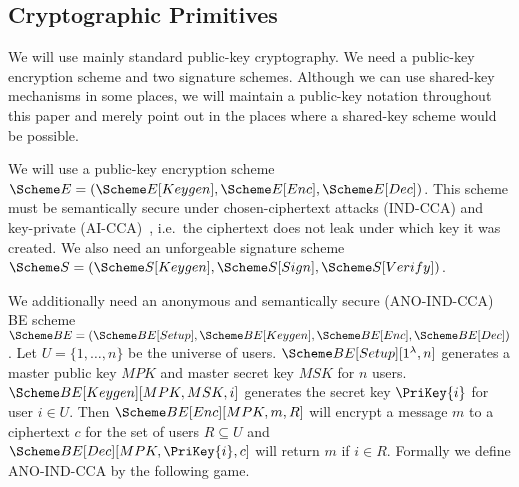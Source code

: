 \subsection{Cryptographic Primitives}
\label{CryptoPrimitives}

We will use mainly standard public-key cryptography.
We need a public-key encryption scheme and two signature schemes.
Although we can use shared-key mechanisms in some places, we will maintain 
a public-key notation throughout this paper and merely point out in the places 
where a shared-key scheme would be possible.

We will use a public-key encryption scheme \(\E = (\E[Keygen], \E[Enc], 
  \E[Dec])\).
This scheme must be semantically secure under chosen-ciphertext attacks 
(IND-CCA) and key-private (AI-CCA)~\cite{KeyPrivacy}, i.e.\ the ciphertext does 
not leak under which key it was created.
We also need an unforgeable signature scheme \(\S = (\S[Keygen], \S[Sign], 
  \S[Verify])\).

We additionally need an anonymous and semantically secure 
(ANO-IND-CCA)~\cite{ANOBE} \ac{BE} scheme \(\BE = (\BE[Setup],\allowbreak 
  \BE[Keygen],\allowbreak \BE[Enc],\allowbreak \BE[Dec])\).
Let \(U = \{1, \ldots, n\}\) be the universe of users.
\(\BE[Setup][1^\lambda, n]\) generates a master public key \(MPK\) and 
master secret key \(MSK\) for \(n\) users.
\(\BE[Keygen][MPK, MSK, i]\) generates the secret key \(\PriKey{i}\) for 
user \(i\in U\).
Then \(\BE[Enc][MPK, m, R]\) will encrypt a message \(m\) to a ciphertext \(c\) 
for the set of users \(R\subseteq U\) and \(\BE[Dec][MPK, \PriKey{i}, c]\) will 
return \(m\) if \(i\in R\).
Formally we define ANO-IND-CCA by the following game.

